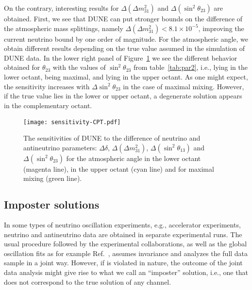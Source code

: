 On the contrary, interesting results for $\Delta(\Delta m_{31}^2)$ and $\Delta(\sin^2\theta_{23})$ are obtained. First, we see that DUNE can put stronger bounds on the difference of the atmospheric mass splittings, namely $\Delta(\Delta m_{31}^2) < 8.1\times 10^{-5}$, improving the current neutrino bound by one order of magnitude. For the atmospheric angle, we obtain different results depending on the true value assumed in the simulation of DUNE data. In the lower right panel of Figure~\ref{fig:sensitivity-CPT} we see the different behavior obtained for $\theta_{23}$ with the values of $\sin^2\theta_{23}$ from table~\ref{tab:par2}, i.e., lying in the lower octant, being maximal, and lying in the upper octant.
As one might expect, the sensitivity increases with $\Delta\sin^2\theta_{23}$ in the case of maximal mixing. However, if the true value lies in the lower or upper octant, a degenerate solution appears in the complementary octant.
\begin{figure}[!htb]
 \centering
        \texttt{[image: sensitivity-CPT.pdf]}
        \caption[Sensitivities to the difference of neutrino and antineutrino parameters]{The sensitivities of DUNE to the difference of neutrino and antineutrino parameters: 
        $\Delta\delta$, $\Delta(\Delta m_{31}^2)$, $\Delta(\sin^2\theta_{13})$ and $\Delta(\sin^2\theta_{23})$  
        for the atmospheric angle in the lower octant (magenta line),  in the upper octant (cyan line) and for maximal mixing (green line).}
	\label{fig:sensitivity-CPT}
\end{figure}

\subsection{Imposter solutions}
\label{sec:impost}
In %
some types of neutrino oscillation experiments, e.g., accelerator experiments, neutrino and antineutrino data are obtained in separate experimental runs. The usual procedure followed by the experimental collaborations, as well as the global oscillation fits as for example Ref.~\cite{deSalas:2017kay}, assumes  invariance and analyzes the full data sample in a joint way.
However, if  is violated in nature, the outcome of the joint data analysis might give rise to what we call an ``imposter'' solution, i.e., one that does not correspond to the true solution of any channel. 

